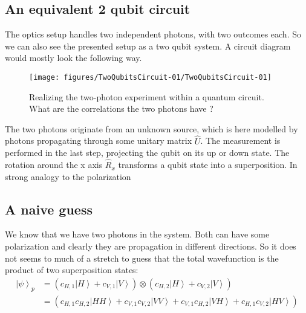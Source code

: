 \documentclass[10pt]{article}
\newcommand{\ket}[1]{\ensuremath{\left|#1\right\rangle}}
\begin{document}
\subsection{An equivalent 2 qubit circuit}

The optics setup handles two independent photons, with two outcomes each. So we can also see the presented setup as a two qubit system. A circuit diagram would mostly look the following way.
\begin{figure}[h!]
\begin{center}
\texttt{[image: figures/TwoQubitsCircuit-01/TwoQubitsCircuit-01]}
\caption{{Realizing the two-photon experiment within a quantum circuit. What are
the correlations the two photons have ?
{\label{840060}}%
}}
\end{center}
\end{figure}

The two photons originate from an unknown source, which is here modelled by photons propagating through some unitary matrix $\hat{U}$. The measurement is performed in the last step, projecting the qubit on its up or down state. The rotation around the x axis $\hat{R}_x$ transforms a qubit state into a superposition. In strong analogy to the polarization 


\subsection{A naive guess}
We know that we have two photons in the system. Both can have some polarization and clearly they are propagation in different directions. So it does not seems to much of a stretch to guess that the total wavefunction is the product of two superposition states:
\begin{align}\label{Eq:Separable}
\ket{\psi}_{p} &= (c_{H,1}\ket{H} +c_{V,1} \ket{V})\otimes(c_{H,2}\ket{H}+c_{V,2}\ket{V}) \\
&= (c_{H,1}c_{H,2}\ket{HH} + c_{V,1}c_{V,2}\ket{VV} + c_{V,1}c_{H,2}\ket{VH} + c_{H,1}c_{V,2}\ket{HV})
\end{align}
\end{document}
